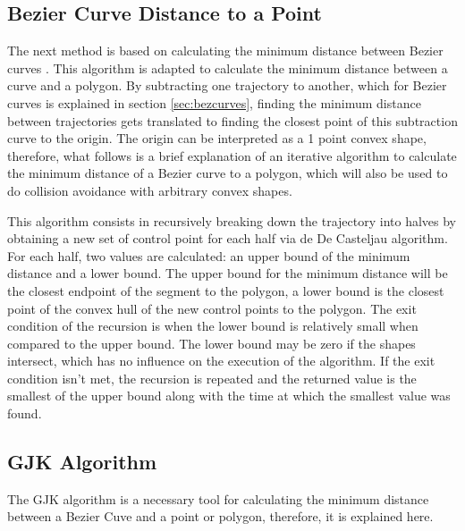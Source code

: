 \subsection{Bezier Curve Distance to a Point}
\label{sec:bezcurvetopoint}

\par The next method is based on calculating the minimum distance between Bezier curves \cite{chang2011computation}. This algorithm is adapted to calculate the minimum distance between a curve and a polygon. By subtracting one trajectory to another, which for Bezier curves is explained in section \ref{sec:bezcurves}, finding the minimum distance between trajectories gets translated to finding the closest point of this subtraction curve to the origin. The origin can be interpreted as a 1 point convex shape, therefore, what follows is a brief explanation of an iterative algorithm to calculate the minimum distance of a Bezier curve to a polygon, which will also be used to do collision avoidance with arbitrary convex shapes.

\par This algorithm consists in recursively breaking down the trajectory into halves by obtaining a new set of control point for each half via de De Casteljau algorithm. For each half, two values are calculated: an upper bound of the minimum distance and a lower bound. The upper bound for the minimum distance will be the closest endpoint of the segment to the polygon, a lower bound is the closest point of the convex hull of the new control points to the polygon. The exit condition of the recursion is when the lower bound is relatively small when compared to the upper bound. The lower bound may be zero if the shapes intersect, which has no influence on the execution of the algorithm. If the exit condition isn't met, the recursion is repeated and the returned value is the smallest of the upper bound along with the time at which the smallest value was found.

\subsection{GJK Algorithm}
\label{sec:gjkalg}

\par The \ac{GJK} algorithm is a necessary tool for calculating the minimum distance between a Bezier Cuve and a point or polygon, therefore, it is explained here.

